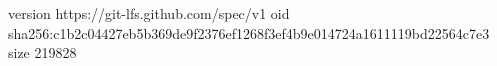 version https://git-lfs.github.com/spec/v1
oid sha256:c1b2c04427eb5b369de9f2376ef1268f3ef4b9e014724a1611119bd22564c7e3
size 219828
